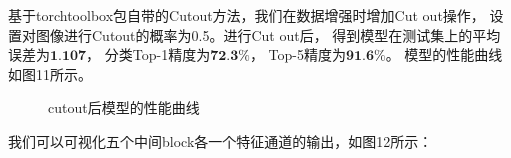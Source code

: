 \documentclass[UTF8]{ctexart}
\begin{document}
基于torchtoolbox包自带的Cutout方法，我们在数据增强时增加Cut out操作，
设置对图像进行Cutout的概率为0.5。进行Cut out后，
得到模型在测试集上的平均误差为$\textbf{1.107}$，
分类Top-1精度为$\textbf{72.3\%}$，
Top-5精度为$\textbf{91.6\%}$。
模型的性能曲线如图11所示。

\begin{figure}[htbp]
    \centering
    \hspace{0.5in}
    \hspace{0.5in}
    \caption{cutout后模型的性能曲线}
\end{figure}

我们可以可视化五个中间block各一个特征通道的输出，如图12所示：
\end{document}
